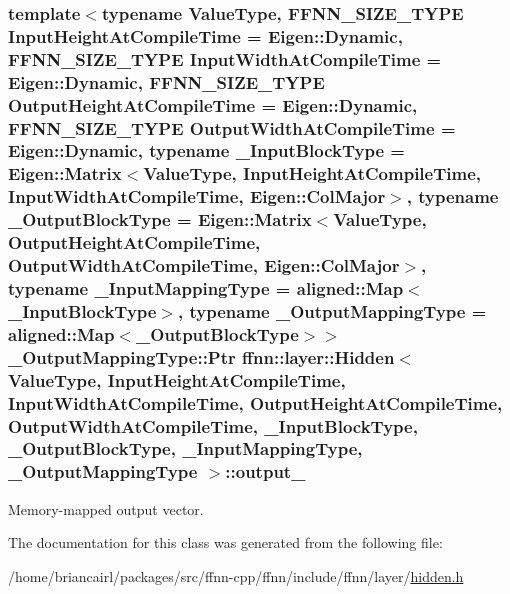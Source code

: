 \hypertarget{classffnn_1_1layer_1_1_hidden_a6dcd89d479af9b2a9359b1f723dae995}{
\subsubsection[{output\-\_\-}]{\setlength{\rightskip}{0pt plus 5cm}template$<$typename Value\-Type, F\-F\-N\-N\-\_\-\-S\-I\-Z\-E\-\_\-\-T\-Y\-P\-E Input\-Height\-At\-Compile\-Time = Eigen\-::\-Dynamic, F\-F\-N\-N\-\_\-\-S\-I\-Z\-E\-\_\-\-T\-Y\-P\-E Input\-Width\-At\-Compile\-Time = Eigen\-::\-Dynamic, F\-F\-N\-N\-\_\-\-S\-I\-Z\-E\-\_\-\-T\-Y\-P\-E Output\-Height\-At\-Compile\-Time = Eigen\-::\-Dynamic, F\-F\-N\-N\-\_\-\-S\-I\-Z\-E\-\_\-\-T\-Y\-P\-E Output\-Width\-At\-Compile\-Time = Eigen\-::\-Dynamic, typename \-\_\-\-Input\-Block\-Type = Eigen\-::\-Matrix$<$\-Value\-Type, Input\-Height\-At\-Compile\-Time, Input\-Width\-At\-Compile\-Time, Eigen\-::\-Col\-Major$>$, typename \-\_\-\-Output\-Block\-Type = Eigen\-::\-Matrix$<$\-Value\-Type, Output\-Height\-At\-Compile\-Time, Output\-Width\-At\-Compile\-Time, Eigen\-::\-Col\-Major$>$, typename \-\_\-\-Input\-Mapping\-Type = aligned\-::\-Map$<$\-\_\-\-Input\-Block\-Type$>$, typename \-\_\-\-Output\-Mapping\-Type = aligned\-::\-Map$<$\-\_\-\-Output\-Block\-Type$>$$>$ \-\_\-\-Output\-Mapping\-Type\-::\-Ptr {\bf ffnn\-::layer\-::\-Hidden}$<$ Value\-Type, Input\-Height\-At\-Compile\-Time, Input\-Width\-At\-Compile\-Time, Output\-Height\-At\-Compile\-Time, Output\-Width\-At\-Compile\-Time, \-\_\-\-Input\-Block\-Type, \-\_\-\-Output\-Block\-Type, \-\_\-\-Input\-Mapping\-Type, \-\_\-\-Output\-Mapping\-Type $>$\-::output\-\_\-\hspace{0.3cm}{\ttfamily [protected]}}}\label{classffnn_1_1layer_1_1_hidden_a6dcd89d479af9b2a9359b1f723dae995}


Memory-\/mapped output vector. 



The documentation for this class was generated from the following file\-:\begin{DoxyCompactItemize}
\item 
/home/briancairl/packages/src/ffnn-\/cpp/ffnn/include/ffnn/layer/\hyperlink{hidden_8h}{hidden.\-h}\end{DoxyCompactItemize}
